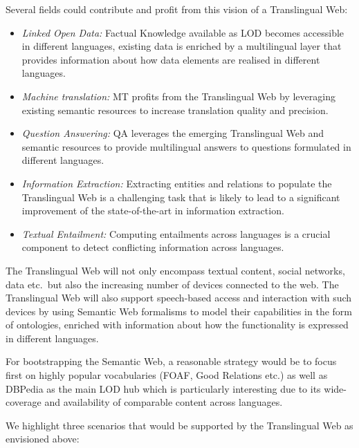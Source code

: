 \documentclass[10pt, plain]{../../metanetpaper}
\begin{document}
\begin{multicols}{2}
Several fields could contribute and profit from this vision of a Translingual Web:

\begin{itemize}
\item \emph{Linked Open Data:} Factual Knowledge available as LOD becomes accessible in different languages, existing data is enriched by a multilingual layer that provides information about how data elements are realised in different languages.
\item \emph{Machine translation:} MT profits from the Translingual Web by leveraging existing semantic resources to increase translation quality and precision.
\item \emph{Question Answering:} QA leverages the emerging Translingual Web and semantic resources to provide multilingual answers to questions formulated in different languages.
\item \emph{Information Extraction:} Extracting entities and relations to populate the Translingual Web is a challenging task that is likely to lead to a significant improvement of the state-of-the-art in information extraction.
\item \emph{Textual Entailment:} Computing entailments across languages is a crucial component to detect conflicting information across languages.
\end{itemize}

The Translingual Web will not only encompass textual content, social networks, data etc.~but also the increasing number of devices connected to the web. The Translingual Web will also support speech-based access and interaction with such devices by using Semantic Web formalisms to model their capabilities in the form of ontologies, enriched with information about how the functionality is expressed in different languages.

For bootstrapping the Semantic Web, a reasonable strategy would be to focus first on highly popular vocabularies (FOAF, Good Relations etc.) as well as DBPedia as the main LOD hub which is particularly interesting due to its wide-coverage and availability of comparable content across languages.

We highlight three scenarios that would be supported by the Translingual Web as envisioned above:


\end{multicols}
\end{document}

